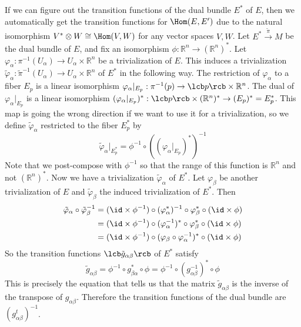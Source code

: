 If we can figure out the transition functions of the dual bundle $E^*$ of $E$, then we automatically get the transition functions for $\Hom(E,E')$ due to the natural isomorphism $V^* \otimes W \cong \Hom(V,W)$ for any vector spaces $V,W$. Let $E^* \stackrel{\tilde\pi}{\rightarrow} M$ be the dual bundle of $E$, and fix an isomorphism $\phi : \mathbb R^n \rightarrow (\mathbb R^n)^*$. Let $\varphi_\alpha : \pi^{-1}(U_\alpha) \rightarrow U_\alpha \times \mathbb R^n$ be a trivialization of $E$. This induces a trivialization $\tilde\varphi_\alpha : \tilde\pi^{-1}(U_\alpha) \rightarrow U_\alpha \times \mathbb R^n$ of $E^*$ in the following way. The restriction of $\varphi_\alpha$ to a fiber $E_p$ is a linear isomorphism $\varphi_\alpha|_{E_p} : \pi^{-1}(p) \rightarrow \lcb p \rcb \times \mathbb R^n$. The dual of $\varphi_\alpha|_{E_p}$ is a linear isomorphism $(\varphi_\alpha|_{E_p})^* : \lcb p \rcb \times (\mathbb R^n)^* \rightarrow (E_p)^* = E_p^*$. This map is going the wrong direction if we want to use it for a trivialization, so we define $\tilde\varphi_\alpha$ restricted to the fiber $E_p^*$ by
\[ \tilde\varphi_\alpha|_{E_p^*} = \phi^{-1} \circ \left( (\varphi_\alpha|_{E_p})^* \right)^{-1} \]
Note that we post-compose with $\phi^{-1}$ so that the range of this function is $\mathbb R^n$ and not $(\mathbb R^n)^*$. Now we have a trivialization $\tilde\varphi_\alpha$ of $E^*$. Let $\varphi_\beta$ be another trivialization of $E$ and $\tilde\varphi_\beta$ the induced trivialization of $E^*$. Then
\begin{align*}
   \tilde\varphi_\alpha \circ \tilde\varphi_\beta^{-1} &= (\id \times \phi^{-1}) \circ (\varphi_\alpha^*)^{-1} \circ \varphi_\beta^* \circ (\id \times \phi)  \\
                                                       &= (\id \times \phi^{-1}) \circ (\varphi_\alpha^{-1})^* \circ \varphi_\beta^* \circ (\id \times \phi) \\
                                                       &= (\id \times \phi^{-1}) \circ (\varphi_\beta \circ \varphi_\alpha^{-1})^* \circ (\id \times \phi) 
\end{align*} 
So the transition functions $\lcb \tilde{g}_{\alpha\beta} \rcb$ of $E^*$ satisfy
\[ \tilde g_{\alpha\beta} = \phi^{-1} \circ g_{\beta\alpha}^* \circ \phi = \phi^{-1} \circ (g_{\alpha\beta}^{-1})^* \circ \phi \]
This is precisely the equation that tells us that the matrix $\tilde g_{\alpha\beta}$ is the inverse of the transpose of $g_{\alpha\beta}$. Therefore the transition functions of the dual bundle are $(g_{\alpha\beta}^t)^{-1}$. 


